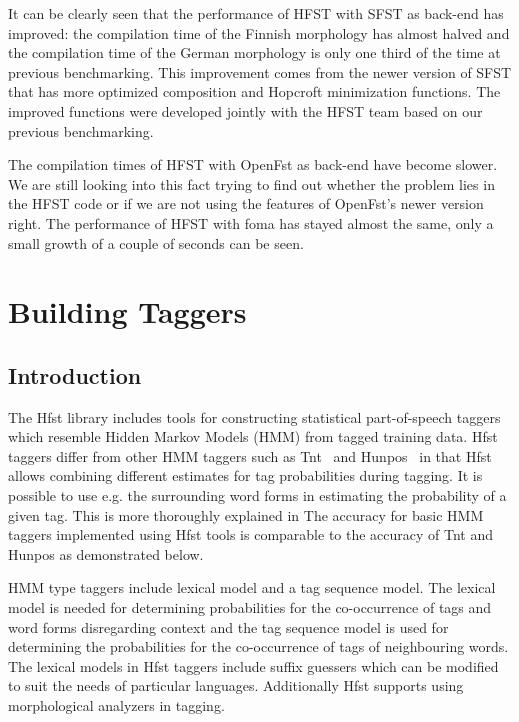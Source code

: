 \documentclass{llncs}
\begin{document}
It can be clearly seen that the performance of HFST with SFST as back-end 
has improved: the compilation time of the Finnish morphology has almost
halved and the compilation time of the German morphology is only one third of the
time at previous benchmarking. 
This improvement comes from the newer version of SFST that has more optimized
composition and Hopcroft minimization functions. The improved functions 
were developed jointly with the HFST team based on our previous benchmarking.

The compilation times of HFST with OpenFst as back-end have become slower.
We are still looking into this fact trying to find out whether
the problem lies in the HFST code or if we are not using the features of 
OpenFst's newer version right.
The performance of HFST with foma has stayed almost the same, only a small
growth of a couple of seconds can be seen.
 

\section{Building Taggers}

\subsection{Introduction}

The Hfst library includes tools for constructing statistical
 part-of-speech taggers which resemble Hidden Markov Models (HMM) from
 tagged training data. Hfst taggers differ from other HMM taggers such
 as Tnt~\cite{Brants:2000} and Hunpos~\cite{Halascy:2007} in that Hfst
 allows combining different estimates for tag probabilities during
 tagging. It is possible to use e.g. the surrounding word forms in
 estimating the probability of a given tag. This is more thoroughly
 explained in \cite{Silfverberg/2010/IceTal,Silfverberg/2011} The
 accuracy for basic HMM taggers implemented using Hfst tools is
 comparable to the accuracy of Tnt and Hunpos as demonstrated below.

HMM type taggers include lexical model and a tag sequence model. The
 lexical model is needed for determining probabilities for the
 co-occurrence of tags and word forms disregarding context and the tag
 sequence model is used for determining the probabilities for the
 co-occurrence of tags of neighbouring words. The lexical models in
 Hfst taggers include suffix guessers which can be modified to suit
 the needs of particular languages. Additionally Hfst supports using
 morphological analyzers in tagging.
\end{document}
